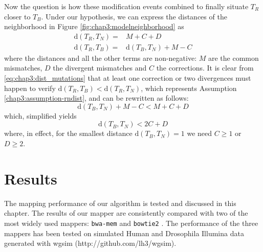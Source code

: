 Now the question is how these modification events combined to finally
situate $T_R$ closer to $T_B$. Under our hypothesis, we can express
the distances of the neighborhood in Figure
\ref{fig:chap3:modelneighborhood} as
\begin{equation}
  \begin{array}{cl}
    \label{eq:chap3:dist_mutations}
    \mathrm{d}(T_R,T_N) = & M + C + D \\
    \mathrm{d}(T_R,T_B) = & \mathrm{d}(T_B,T_N) + M - C
  \end{array}
\end{equation}
where the distances and all the other terms are non-negative: $M$ are
the common mismatches, $D$ the divergent mismatches and $C$ the
corrections. It is clear from \eqref{eq:chap3:dist_mutations} that at
least one correction or two divergences must happen to verify
$\mathrm{d}(T_R,T_B) < \mathrm{d}(T_R,T_N)$, which represents
Assumption \ref{chap3:assumption-rndist}, and can be rewritten as
follows:
\begin{equation}
  \label{eq:chap3:rndist_mutations}
  \mathrm{d}(T_B,T_N) + M - C < M + C + D
\end{equation}
which, simplified yields
\begin{equation}
  \label{eq:chap3:rndist_mutations_simp}
  \mathrm{d}(T_B,T_N) < 2C + D
\end{equation}
where, in effect, for the smallest distance $\mathrm{d}(T_B,T_N)=1$ we
need $C\ge1$ or $D\ge2$.






\chapter{Results}

The mapping performance of our algorithm is tested and discussed in
this chapter. The results of our mapper are consistently compared with
two of the most widely used mappers: \texttt{bwa-mem} \cite{bwa} and
\texttt{bowtie2} \cite{bowtie}. The performance of the three mappers
has been tested on simulated Human and Drosophila Illumina data
generated with wgsim (http://github.com/lh3/wgsim). 

